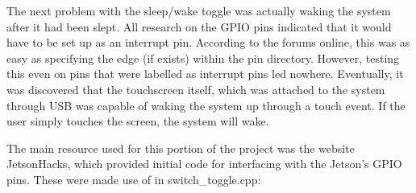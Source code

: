 \documentclass[onecolumn, draftclsnofoot, 10pt, compsoc]{IEEEtran}
\begin{document}
The next problem with the sleep/wake toggle was actually waking the system after it had been slept. All research on the GPIO pins indicated that it would have to be set up as an interrupt pin. According to the forums online, this was as easy as specifying the edge (if exists) within the pin directory. However, testing this even on pins that were labelled as interrupt pins led nowhere. Eventually, it was discovered that the touchscreen itself, which was attached to the system through USB was capable of waking the system up through a touch event. If the user simply touches the screen, the system will wake. \par

The main resource used for this portion of the project was the website JetsonHacks, which provided initial code for interfacing with the Jetson's GPIO pins. These were made use of in switch\_toggle.cpp:
\end{document}
